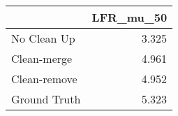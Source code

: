 \begin{tabular}{lr}
\toprule
{} & LFR_mu_50 \\
\midrule
No Clean Up  &     3.325 \\
Clean-merge  &     4.961 \\
Clean-remove &     4.952 \\
Ground Truth &     5.323 \\
\bottomrule
\end{tabular}

